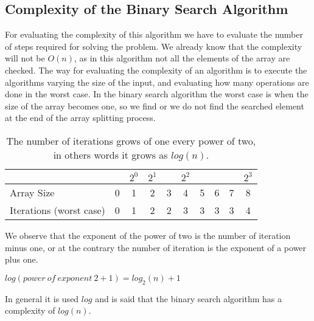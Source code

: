 \subsection{Complexity of the Binary Search Algorithm}
For evaluating the complexity of this algorithm we have to evaluate the number of steps required for solving the problem. We already know that the complexity will not be \(O(n)\), as in this algorithm not all the elements of the array are checked. The way for evaluating the complexity of an algorithm is to execute the algorithms varying the size of the input, and evaluating how many operations are done in the worst case. In the binary search algorithm the worst case is when the size of the array becomes one, so we find or we do not find the searched element at the end of the array splitting process.

\begin{table}[H]
\caption[Binary search complexity.]{The number of iterations grows of one every power of two, in others words it grows as \(log(n)\).}
\label{binarysearchefficiency}
\centering
\begin{tabular}{ | l | c | c | c | c | c | c | c | c | c |}
   
    \multicolumn{1}{l}{} & \multicolumn{1}{c}{} & 
    \multicolumn{1}{c}{\(2^{0}\)} & \multicolumn{1}{c}{\(2^{1}\)} &
    \multicolumn{1}{c}{} & \multicolumn{1}{c}{\(2^{2}\)} & 
    \multicolumn{1}{c}{} & \multicolumn{1}{c}{}          & 
    \multicolumn{1}{c}{} & \multicolumn{1}{c}{\(2^{3}\)} \\
    \hline
	Array Size & 0 & \cellcolor{LightCyan} 1 & \cellcolor{LightCyan} 2 & 3 & \cellcolor{LightCyan} 4  & 5 & 6 & 7 & \cellcolor{LightCyan} 8 \\
    \hline
	Iterations (worst case) & 0 & \cellcolor{LightCyan} 1 & \cellcolor{LightCyan} 2 & 2 & \cellcolor{LightCyan} 3 & 3 & 3 & 3 & \cellcolor{LightCyan} 4 \\
	\hline	
\end{tabular}
\end{table}

We observe that the exponent of the power of two is the number of iteration minus one, or at the contrary the number of iteration is the exponent of a power plus one.
\begin{center}
\(log( power\ of\ exponent\ 2 + 1) = log_{2}(n) + 1\)
\end{center}
In general it is used \(log\) and is said that the binary search algorithm has a complexity of \(log(n)\). 

